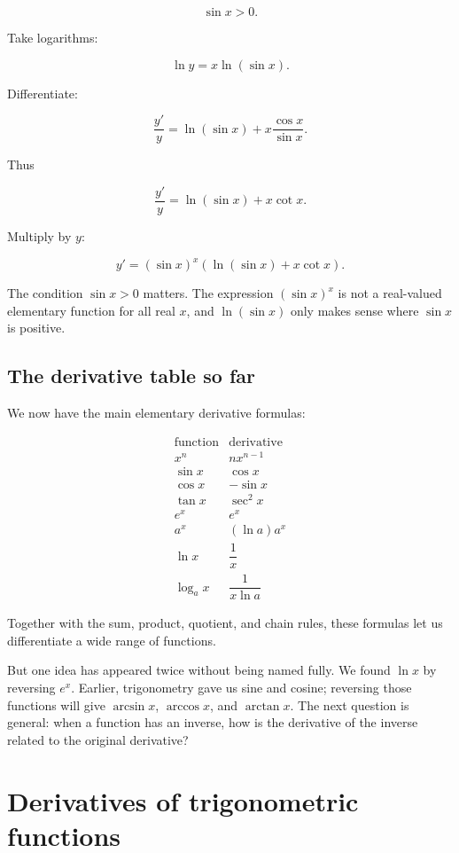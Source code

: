 \[
\sin x>0.
\]

Take logarithms:

\[
\ln y=x\ln(\sin x).
\]

Differentiate:

\[
\frac{y'}{y}
=
\ln(\sin x)+x\frac{\cos x}{\sin x}.
\]

Thus

\[
\frac{y'}{y}
=
\ln(\sin x)+x\cot x.
\]

Multiply by \(y\):

\[
\boxed{
y'
=
(\sin x)^x\left(\ln(\sin x)+x\cot x\right).
}
\]

The condition \(\sin x>0\) matters.  The expression \((\sin x)^x\) is not a real-valued elementary function for all real \(x\), and \(\ln(\sin x)\) only makes sense where \(\sin x\) is positive.

\subsection{The derivative table so far}
\label{subsec:derivative-table-so-far}

We now have the main elementary derivative formulas:

\[
\boxed{
\begin{array}{c|c}
\text{function} & \text{derivative} \\ \hline
x^n & nx^{n-1} \\[3pt]
\sin x & \cos x \\[3pt]
\cos x & -\sin x \\[3pt]
\tan x & \sec^2x \\[3pt]
e^x & e^x \\[3pt]
a^x & (\ln a)a^x \\[3pt]
\ln x & \dfrac1x \\[8pt]
\log_a x & \dfrac1{x\ln a}
\end{array}
}
\]

Together with the sum, product, quotient, and chain rules, these formulas let us differentiate a wide range of functions.

But one idea has appeared twice without being named fully.  We found \(\ln x\) by reversing \(e^x\).  Earlier, trigonometry gave us sine and cosine; reversing those functions will give \(\arcsin x\), \(\arccos x\), and \(\arctan x\).  The next question is general: when a function has an inverse, how is the derivative of the inverse related to the original derivative?
\section{Derivatives of trigonometric functions}\Core
\label{sec:deriv-trig}

